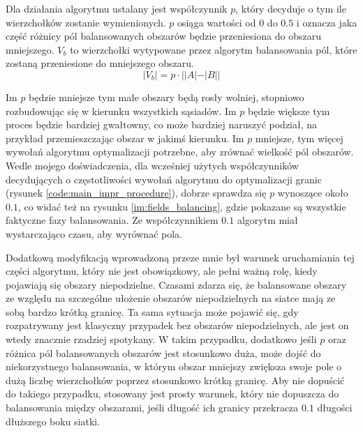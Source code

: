 \newpage
Dla działania algorytmu ustalany jest współczynnik $p$, który decyduje o tym ile wierzchołków zostanie wymienionych.
$p$ osiąga wartości od $0$ do $0.5$ i oznacza jaka część różnicy pól balansowanych obszarów będzie przeniesiona do obszaru
mniejszego.
$V_b$ to wierzchołki wytypowane przez algorytm balansowania pól, które zostaną przeniesione do mniejszego
obszaru.
\begin{equation}
|V_b| = p \cdot ||A| - |B||
\end{equation}

Im $p$ będzie mniejsze tym małe obszary będą rosły wolniej, stopniowo rozbudowując się w kierunku wszystkich sąsiadów.
Im $p$ będzie większe tym proces będzie bardziej gwałtowny, co może bardziej naruszyć podział, na przykład przemieszczając
obszar w jakimś kierunku.
Im $p$ mniejsze, tym więcej wywołań algorytmu optymalizacji potrzebne, aby zrównać wielkość pól obszarów.
Wedle mojego doświadczenia, dla wcześniej użytych współczynników decydujących o częstotliwości
wywołań algorytmu do optymalizacji granic (rysunek \ref{code:main_impr_procedure}), dobrze sprawdza się $p$ wynoszące
około $0.1$, co widać też na rysunku \ref{im:fields_balancing}, gdzie pokazane są wszystkie faktyczne fazy balansowania.
Ze współczynnikiem $0.1$ algorytm miał wystarczająco czasu, aby wyrównać pola.

Dodatkową modyfikacją wprowadzoną przeze mnie był warunek uruchamiania tej części algorytmu, który nie jest obowiązkowy,
ale pełni ważną rolę, kiedy pojawiają się obszary niepodzielne.
Czasami zdarza się, że balansowane obszary ze względu na szczególne ułożenie obszarów niepodzielnych na siatce
mają ze sobą bardzo krótką granicę.
Ta sama sytuacja może pojawić się, gdy rozpatrywany jest klasyczny przypadek bez obszarów
niepodzielnych, ale jest on wtedy znacznie rzadziej spotykany.
W takim przypadku, dodatkowo jeśli $p$ oraz różnica pól balansowanych obszarów jest stosunkowo duża, może dojść
do niekorzystnego balansowania, w którym obszar mniejszy zwiększa swoje pole o dużą liczbę wierzchołków poprzez
stosunkowo krótką granicę.
Aby nie dopuścić do takiego przypadku, stosowany jest prosty warunek, który nie dopuszcza do balansowania
między obszarami, jeśli długość ich granicy przekracza $0.1$ długości dłuższego boku siatki.

